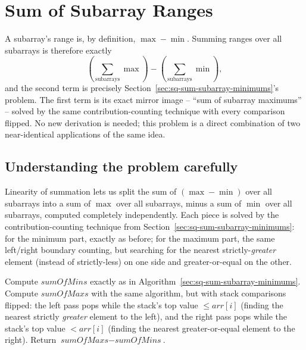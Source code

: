 \section{Sum of Subarray Ranges}
\label{sec:sq-sum-subarray-ranges}


\begin{patternbox}
A subarray's range is, by definition, $\max - \min$. Summing ranges over
all subarrays is therefore exactly
\[
  \left(\sum_{\text{subarrays}} \max\right) -
  \left(\sum_{\text{subarrays}} \min\right),
\]
and the second term is precisely Section~\ref{sec:sq-sum-subarray-minimums}'s
problem. The first term is its exact mirror image -- ``sum of subarray
maximums'' -- solved by the same contribution-counting technique with
every comparison flipped. No new derivation is needed; this problem is a
direct combination of two near-identical applications of the same idea.
\end{patternbox}

\subsection*{Understanding the problem carefully}

Linearity of summation lets us split the sum of $(\max - \min)$ over all
subarrays into a sum of $\max$ over all subarrays, minus a sum of
$\min$ over all subarrays, computed completely independently. Each piece
is solved by the contribution-counting technique from
Section~\ref{sec:sq-sum-subarray-minimums}: for the minimum part, exactly
as before; for the maximum part, the same left/right boundary counting,
but searching for the nearest strictly-\emph{greater} element (instead of
strictly-less) on one side and greater-or-equal on the other.

\begin{ideabox}
Compute $\textit{sumOfMins}$ exactly as in
Algorithm~\ref{sec:sq-sum-subarray-minimums}. Compute
$\textit{sumOfMaxs}$ with the same algorithm, but with stack comparisons
flipped: the left pass pops while the stack's top value $\le
\textit{arr}[i]$ (finding the nearest strictly \emph{greater} element to
the left), and the right pass pops while the stack's top value $<
\textit{arr}[i]$ (finding the nearest greater-or-equal element to the
right). Return $\textit{sumOfMaxs} - \textit{sumOfMins}$.
\end{ideabox}

